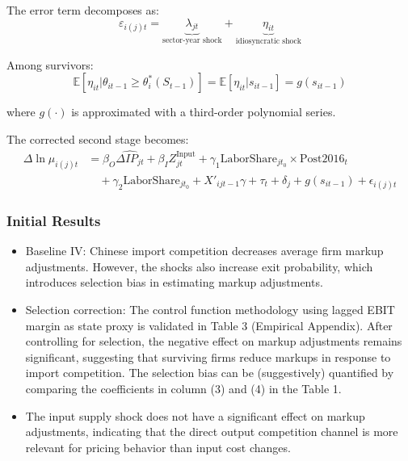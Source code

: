 \documentclass[12pt]{article}
\begin{document}
The error term decomposes as:
\[
\varepsilon_{i(j)t} = \underbrace{\lambda_{jt}}_{\text{sector-year shock}} + \underbrace{\eta_{it}}_{\text{idiosyncratic shock}}
\]

Among survivors:
\[
\mathbb{E}[\eta_{it} | \theta_{it-1} \geq \theta_i^*(S_{t-1})] = \mathbb{E}[\eta_{it} | s_{it-1}] = g(s_{it-1})
\]

where $g(\cdot)$ is approximated with a third-order polynomial series.

The corrected second stage becomes:
\begin{equation}
\begin{aligned}
\Delta \ln \mu_{i(j)t} &= \beta_O \widehat{\Delta IP_{jt}} + \beta_I Z_{jt}^{\text{Input}} + \gamma_1 \text{LaborShare}_{jt_0} \times \text{Post2016}_t \\
&\quad + \gamma_2 \text{LaborShare}_{jt_0} + X'_{ijt-1} \gamma + \tau_t + \delta_j + g(s_{it-1}) + \epsilon_{i(j)t}
\end{aligned}
\tag{3}
\end{equation}

\subsubsection{Initial Results}
    \begin{itemize}
        \item Baseline IV: Chinese import competition decreases average firm markup adjustments. However, the shocks also increase exit probability, which introduces selection bias in estimating markup adjustments. 
        \item Selection correction: The control function methodology using lagged EBIT margin as state proxy is validated in Table 3 (Empirical Appendix). After controlling for selection, the negative effect on markup adjustments remains significant, suggesting that surviving firms reduce markups in response to import competition. The selection bias can be (suggestively) quantified by comparing the coefficients in column (3) and (4) in the Table 1. 
        \item The input supply shock does not have a significant effect on markup adjustments, indicating that the direct output competition channel is more relevant for pricing behavior than input cost changes. 
    \end{itemize}
\end{document}
